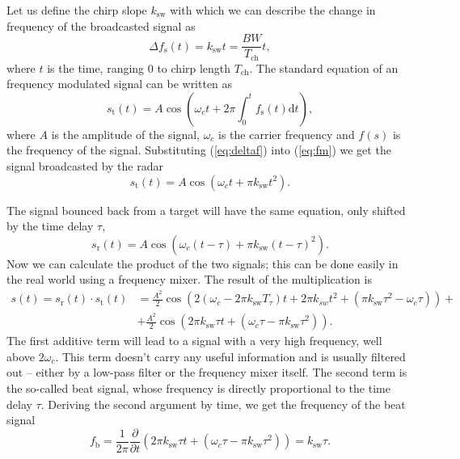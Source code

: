 Let us define the chirp slope $k_\mathrm{sw}$ with which we can describe the change in frequency of the broadcasted signal as
\begin{equation}
  \Delta f_\mathrm{s}(t) = k_\mathrm{sw}t = \frac{BW}{T_\mathrm{ch}} t,
  \label{eq:deltaf}
\end{equation}
where $t$ is the time, ranging 0 to chirp length $T_\mathrm{ch}$.
The standard equation of an frequency modulated signal can be written as
\begin{equation}
  s_\mathrm{t}(t) = A \cos\left(\omega_c t + 2\pi \int_{0}^{t} f_\mathrm{s}(t) \mathrm{d}t\right),
  \label{eq:fm}
\end{equation}
where $A$ is the amplitude of the signal, $\omega_c$ is the carrier frequency and $f(s)$ is the frequency of the signal.
Substituting (\ref{eq:deltaf}) into (\ref{eq:fm}) we get the signal broadcasted by the radar \cite{suleymanov2016}
\begin{equation}
  s_\mathrm{t}(t) = A \cos(\omega_c t + \pi k_\mathrm{sw}t^2).
  \label{eq:fm2}
\end{equation}

The signal bounced back from a target will have the same equation, only shifted by the time delay $\tau$,
\begin{equation}
  s_\mathrm{r}(t) = A \cos(\omega_c (t - \tau) + \pi k_\mathrm{sw}(t - \tau)^2).
  \label{eq:fm3}
\end{equation}
Now we can calculate the product of the two signals; this can be done easily in the real world using a frequency mixer.
The result of the multiplication is  \cite{suleymanov2016}
\begin{align}
  s(t) = s_\mathrm{r}(t) \cdot  s_\mathrm{t}(t) & = \frac{A^2}{2}\cos\left(2(\omega_c - 2\pi k_\mathrm{sw}T_\tau)t + 2\pi k_{sw}t^2 + (\pi k_\mathrm{sw} \tau^2 - \omega_c \tau) \right)+ \nonumber \\
                                                & +\frac{A^2}{2} \cos\left(2\pi k_\mathrm{sw} \tau t + (\omega_c \tau - \pi k_\mathrm{sw} \tau^2)\right).
  \label{eq:fm4}
\end{align}
The first additive term will lead to a signal with a very high frequency, well above $2\omega_c$.
This term doesn't carry any useful information and is usually filtered out -- either by a low-pass filter or the frequency mixer itself.
The second term is the so-called beat signal, whose frequency is directly proportional to the time delay $\tau$.
Deriving the second argument by time, we get the frequency of the beat signal \cite{graham2005}
\begin{equation}
  f_\mathrm{b} = \frac{1}{2\pi}\frac{\partial}{\partial t} \left(2\pi k_\mathrm{sw} \tau t + (\omega_c \tau - \pi k_\mathrm{sw} \tau^2)\right) = k_\mathrm{sw} \tau.
  \label{eq:fb}
\end{equation}

